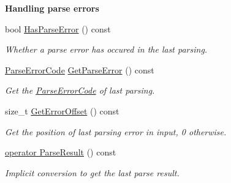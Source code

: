 \begin{Indent}{\bf Handling parse errors}\par
\begin{DoxyCompactItemize}
\item 
bool \hyperlink{a00115_afe0c87d9fc13a78597360e0646479419}{Has\+Parse\+Error} () const \hypertarget{a00115_afe0c87d9fc13a78597360e0646479419}{}\label{a00115_afe0c87d9fc13a78597360e0646479419}

\begin{DoxyCompactList}\small\item\em Whether a parse error has occured in the last parsing. \end{DoxyCompactList}\item 
\hyperlink{a00832_ga8d4b32dfc45840bca189ade2bbcb6ba7}{Parse\+Error\+Code} \hyperlink{a00115_aab4771355aa3c6e5368da3ae36f38cc1}{Get\+Parse\+Error} () const \hypertarget{a00115_aab4771355aa3c6e5368da3ae36f38cc1}{}\label{a00115_aab4771355aa3c6e5368da3ae36f38cc1}

\begin{DoxyCompactList}\small\item\em Get the \hyperlink{a00832_ga8d4b32dfc45840bca189ade2bbcb6ba7}{Parse\+Error\+Code} of last parsing. \end{DoxyCompactList}\item 
size\+\_\+t \hyperlink{a00115_a2db6ad11d157342f725470fb898b6712}{Get\+Error\+Offset} () const \hypertarget{a00115_a2db6ad11d157342f725470fb898b6712}{}\label{a00115_a2db6ad11d157342f725470fb898b6712}

\begin{DoxyCompactList}\small\item\em Get the position of last parsing error in input, 0 otherwise. \end{DoxyCompactList}\item 
\hyperlink{a00115_a12ce1db7b06e2565b6abb2112a681c71}{operator Parse\+Result} () const 
\begin{DoxyCompactList}\small\item\em Implicit conversion to get the last parse result. \end{DoxyCompactList}\end{DoxyCompactItemize}
\end{Indent}
